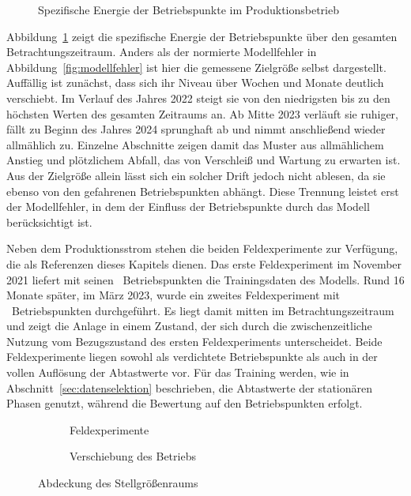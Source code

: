 %
\begin{figure}[tbp]
    \centering
    
    \caption{Spezifische Energie der Betriebspunkte im Produktionsbetrieb}
    \label{fig:mill_data_timeline}
\end{figure}
%
Abbildung~\ref{fig:mill_data_timeline} zeigt die spezifische Energie der Betriebspunkte über den gesamten Betrachtungszeitraum. Anders als der normierte Modellfehler in Abbildung~\ref{fig:modellfehler} ist hier die gemessene Zielgröße selbst dargestellt. Auffällig ist zunächst, dass sich ihr Niveau über Wochen und Monate deutlich verschiebt. Im Verlauf des Jahres 2022 steigt sie von den niedrigsten bis zu den höchsten Werten des gesamten Zeitraums an. Ab Mitte 2023 verläuft sie ruhiger, fällt zu Beginn des Jahres 2024 sprunghaft ab und nimmt anschließend wieder allmählich zu. Einzelne Abschnitte zeigen damit das Muster aus allmählichem Anstieg und plötzlichem Abfall, das von Verschleiß und Wartung zu erwarten ist. Aus der Zielgröße allein lässt sich ein solcher Drift jedoch nicht ablesen, da sie ebenso von den gefahrenen Betriebspunkten abhängt. Diese Trennung leistet erst der Modellfehler, in dem der Einfluss der Betriebspunkte durch das Modell berücksichtigt ist. \par
%
Neben dem Produktionsstrom stehen die beiden Feldexperimente zur Verfügung, die als Referenzen dieses Kapitels dienen. Das erste Feldexperiment im November 2021 liefert mit seinen \millDoeOneN~Betriebspunkten die Trainingsdaten des Modells. Rund 16 Monate später, im März 2023, wurde ein zweites Feldexperiment mit \millDoeTwoN~Betriebspunkten durchgeführt. Es liegt damit mitten im Betrachtungszeitraum und zeigt die Anlage in einem Zustand, der sich durch die zwischenzeitliche Nutzung vom Bezugszustand des ersten Feldexperiments unterscheidet. Beide Feldexperimente liegen sowohl als verdichtete Betriebspunkte als auch in der vollen Auflösung der Abtastwerte vor. Für das Training werden, wie in Abschnitt~\ref{sec:datenselektion} beschrieben, die Abtastwerte der stationären Phasen genutzt, während die Bewertung auf den Betriebspunkten erfolgt. \par
%
\begin{figure}[tbp]
    \centering
    \begin{subfigure}[t]{0.49\textwidth}
        \centering
        
        \caption{Feldexperimente}
        \label{fig:mill_data_coverage_doe}
    \end{subfigure}
    \hfill
    \begin{subfigure}[t]{0.49\textwidth}
        \centering
        
        \caption{Verschiebung des Betriebs}
        \label{fig:mill_data_coverage_shift}
    \end{subfigure}
    \caption{Abdeckung des Stellgrößenraums}
    \label{fig:mill_data_coverage}
\end{figure}
